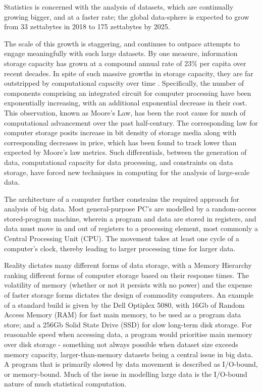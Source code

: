 Statistics is concerned with the analysis of datasets, which are
continually growing bigger, and at a faster rate; the global data-sphere
is expected to grow from 33 zettabytes in 2018 to 175 zettabytes by
2025\cite{rydning2018digitization}.

The scale of this growth is staggering, and continues to outpace
attempts to engage meaningfully with such large datasets. By one
measure, information storage capacity has grown at a compound annual
rate of 23\% per capita over recent decades\cite{hilbert2011world}. In
spite of such massive growths in storage capacity, they are far
outstripped by computational capacity over time \cite{fontana2018moore}.
Specifically, the number of components comprising an integrated circuit
for computer processing have been exponentially increasing, with an
additional exponential decrease in their cost\cite{moore1975progress}.
This observation, known as Moore's Law, has been the root cause for much
of computational advancement over the past half-century. The
corresponding law for computer storage posits increase in bit density of
storage media along with corresponding decreases in price, which has
been found to track lower than expected by Moore's law metrics. Such
differentials, between the generation of data, computational capacity
for data processing, and constraints on data storage, have forced new
techniques in computing for the analysis of large-scale data.

The architecture of a computer further constrains the required approach
for analysis of big data. Most general-purpose PC's are modelled by a
random-access stored-program machine, wherein a program and data are
stored in registers, and data must move in and out of registers to a
processing element, most commonly a Central Processing Unit (CPU). The
movement takes at least one cycle of a computer's clock, thereby leading
to larger processing time for larger data.

Reality dictates many different forms of data storage, with a Memory
Hierarchy ranking different forms of computer storage based on their
response times\cite{toy1986computer}. The volatility of memory (whether
or not it persists with no power) and the expense of faster storage
forms dictates the design of commodity computers. An example of a
standard build is given by the Dell Optiplex 5080, with 16Gb of Random
Access Memory (RAM) for fast main memory, to be used as a program data
store; and a 256Gb Solid State Drive (SSD) for slow long-term disk
storage\cite{cornell2021standardcomp}. For reasonable speed when
accessing data, a program would prioritise main memory over disk storage
- something not always possible when dataset size exceeds memory
capacity, larger-than-memory datasets being a central issue in big data.
A program that is primarily slowed by data movement is described as
I/O-bound, or memory-bound. Much of the issue in modelling large data is
the I/O-bound nature of much statistical computation.

